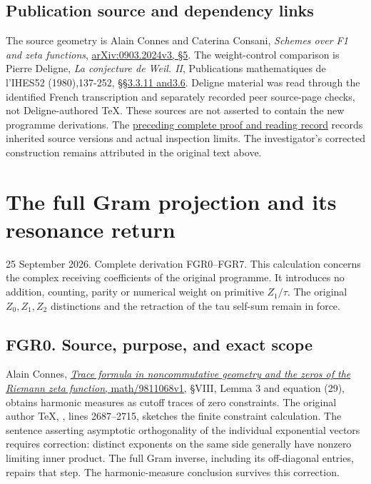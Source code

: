 \section{Publication source and dependency
links}\label{publication-source-and-dependency-links-12}

The source geometry is Alain Connes and Caterina Consani, \emph{Schemes
over F1 and zeta functions},
\href{https://arxiv.org/abs/0903.2024v3}{arXiv:0903.2024v3, §5}. The
weight-control comparison is Pierre Deligne, \emph{La conjecture de
Weil. II}, Publications mathematiques de l'IHES52 (1980),137-252,
\href{https://www.numdam.org/item/PMIHES_1980__52__137_0/}{§§3.3.11
and3.6}. Deligne material was read through the identified French
transcription and separately recorded peer source-page checks, not
Deligne-authored TeX. These sources are not asserted to contain the new
programme derivations. The
\href{https://github.com/KokunoYumeto/zeta-function-research-reader/blob/36a82ecca98addb8a98b48204e349737856c7223/workbenches/splitzero-tandem/continuations/20260924-cohomology-weight-and-character-lifts/BUILD_AND_REVIEW.md}{preceding
complete proof and reading record} records inherited source versions and
actual inspection limits. The investigator's corrected construction
remains attributed in the original text above.

\chapter{The full Gram projection and its resonance
return}\label{the-full-gram-projection-and-its-resonance-return}

25 September 2026. Complete derivation FGR0--FGR7. This calculation
concerns the complex receiving coefficients of the original programme.
It introduces no addition, counting, parity or numerical weight on
primitive \(Z_1/\tau\). The original \(Z_0,Z_1,Z_2\) distinctions and
the retraction of the tau self-sum remain in force.

\section{FGR0. Source, purpose, and exact
scope}\label{fgr0.-source-purpose-and-exact-scope}

Alain Connes, \href{https://arxiv.org/abs/math/9811068v1}{\emph{Trace
formula in noncommutative geometry and the zeros of the Riemann zeta
function}, math/9811068v1}, §VIII, Lemma 3 and equation (29), obtains
harmonic measures as cutoff traces of zero constraints. The original
author TeX,
\href{https://arxiv.org/abs/math/9811068v1}{},
lines 2687--2715, sketches the finite constraint calculation. The
sentence asserting asymptotic orthogonality of the individual
exponential vectors requires correction: distinct exponents on the same
side generally have nonzero limiting inner product. The full Gram
inverse, including its off-diagonal entries, repairs that step. The
harmonic-measure conclusion survives this correction.

